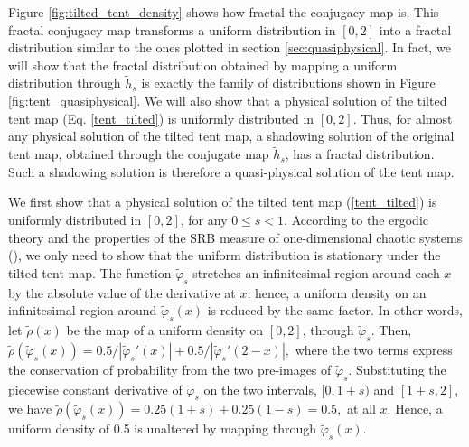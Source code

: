 Figure \ref{fig:tilted_tent_density} shows how fractal the conjugacy map is.
This fractal conjugacy map transforms a uniform distribution in $[0,2]$ into
a fractal distribution similar to the ones plotted in section \ref{sec:quasiphysical}.
In fact, we will show that the fractal distribution obtained by mapping a uniform
distribution through $\tilde{h}_s$ is exactly the family of distributions
shown in Figure \ref{fig:tent_quasiphysical}.  We will also show that
a physical solution of the tilted tent map (Eq. \ref{tent_tilted}) is uniformly
distributed in $[0,2]$.  Thus, for almost any physical solution of the
tilted tent map, a shadowing solution of the original tent map, obtained
through the conjugate map $\tilde{h}_s$, has a fractal distribution.
Such a shadowing solution is therefore a quasi-physical solution of
the tent map.

We first show that a physical solution of the tilted tent map 
(\ref{tent_tilted}) is uniformly distributed in $[0,2]$, for
any $0\le s<1$.
According to the ergodic theory and the properties of the SRB measure of 
one-dimensional chaotic systems (\cite{young}), 
we only need to show that the uniform
distribution is stationary under the tilted tent map.
The function $\tilde{\varphi}_s$ stretches an infinitesimal
region around each $x$ by the absolute value of the derivative at $x$; 
hence, a uniform density on an infinitesimal region around $\tilde{\varphi}_s(x)$ 
is reduced by the same factor. In other words, let $\tilde{\rho}(x)$ 
be the map of a uniform density on $[0,2]$, through $\tilde{\varphi}_s$. Then, 
$\tilde{\rho}(\tilde{\varphi}_s (x)) = 0.5/|\tilde \varphi_s'(x)| + 0.5/|\tilde \varphi_s'(2-x)|,$ where the two terms express the conservation of probability 
from the two pre-images of $\tilde{\varphi}_s$. Substituting the piecewise constant 
derivative of $\tilde{\varphi}_s$ on the two intervals, $[0,1+s)$ and $[1+s,2]$,
we have $\tilde{\rho}(\tilde{\varphi}_s (x)) = 0.25(1+s) + 0.25(1-s) = 0.5,$ at 
all $x.$ Hence, a uniform density of 0.5 is unaltered by mapping through 
$\tilde\varphi_s(x)$.

